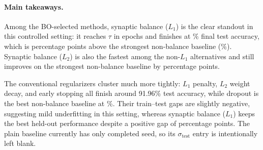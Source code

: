 \paragraph{Main takeaways.}
Among the BO-selected methods, synaptic balance ($L_1$) is the clear standout in this controlled setting: it reaches $\tau$ in \RegMnistSynBalLOneEpochsAtTau epochs and finishes at \RegMnistSynBalLOneFinalTestAccPct\% final test accuracy, which is \RegMnistSynBalLOneGainOverBestNonBalancePpts percentage points above the strongest non-balance baseline (\RegMnistBestNonBalanceFinalTestAccPct\%). Synaptic balance ($L_2$) is also the fastest among the non-$L_1$ alternatives and still improves on the strongest non-balance baseline by \RegMnistSynBalLTwoGainOverBestNonBalancePpts percentage points.

The conventional regularizers cluster much more tightly: $L_1$ penalty, $L_2$ weight decay, and early stopping all finish around 91.96\% test accuracy, while dropout is the best non-balance baseline at \RegMnistDropoutFinalTestAccPct\%. Their train--test gaps are slightly negative, suggesting mild underfitting in this setting, whereas synaptic balance ($L_1$) keeps the best held-out performance despite a positive gap of \RegMnistSynBalLOneGapPpts percentage points. The plain baseline currently has only \RegMnistPlainSeedCount completed seed, so its $\sigma_{\mathrm{test}}$ entry is intentionally left blank.


